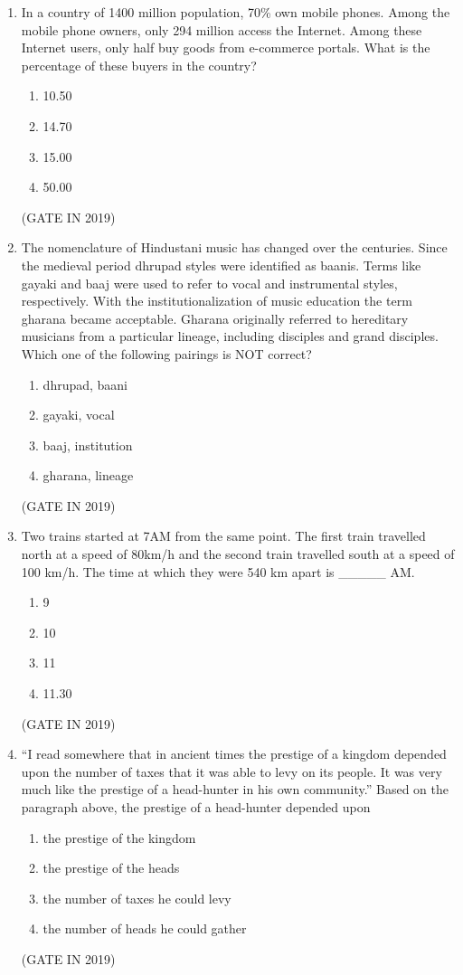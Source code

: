 \documentclass[journal]{IEEEtran}
\begin{document}
\begin{enumerate}
\item In a country of 1400 million population, 70\% own mobile phones. Among the mobile phone owners, only 294 million access the Internet. Among these Internet users, only half buy goods from e-commerce portals. What is the percentage of these buyers in the country?
\begin{multicols}{4}
\begin{enumerate}
\item 10.50
\item 14.70
\item 15.00
\item 50.00
\end{enumerate}
\end{multicols} \hfill(GATE IN 2019)

\item The nomenclature of Hindustani music has changed over the centuries. Since the medieval period dhrupad styles were identified as baanis. Terms like gayaki and baaj were used to refer to vocal and instrumental styles, respectively. With the institutionalization of music education the term gharana became acceptable. Gharana originally referred to hereditary musicians from a particular lineage, including disciples and grand disciples. Which one of the following pairings is NOT correct?
\begin{enumerate}
\item dhrupad, baani
\item gayaki, vocal
\item baaj, institution
\item gharana, lineage
\end{enumerate}
\hfill(GATE IN 2019)

\item Two trains started at 7AM from the same point. The first train travelled north at a speed of 80km/h and the second train travelled south at a speed of 100 km/h. The time at which they were 540 km apart is \_\_\_\_\_ AM.
\begin{multicols}{4}
\begin{enumerate}
\item 9
\item 10
\item 11
\item 11.30
\end{enumerate}
\end{multicols} \hfill(GATE IN 2019)

\item ``I read somewhere that in ancient times the prestige of a kingdom depended upon the number of taxes that it was able to levy on its people. It was very much like the prestige of a head-hunter in his own community.'' Based on the paragraph above, the prestige of a head-hunter depended upon
\begin{enumerate}
\item the prestige of the kingdom
\item the prestige of the heads
\item the number of taxes he could levy
\item the number of heads he could gather
\end{enumerate}
\hfill(GATE IN 2019)


\end{enumerate}
\end{document}
